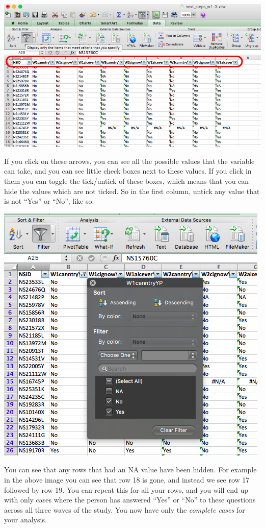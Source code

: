 \documentclass[
]{book}
\begin{document}
\includegraphics{imgs/cc_arrows.png}

If you click on these arrows, you can see all the possible values that the variable can take, and you can see little check boxes next to these values. If you click in them you can toggle the tick/untick of these boxes, which means that you can hide the values which are not ticked. So in the first column, untick any value that is not ``Yes'' or ``No'', like so:

\includegraphics{imgs/untick_not_yn.png}

You can see that any rows that had an NA value have been hidden. For example in the above image you can see that row 18 is gone, and instead we see row 17 followed by row 19. You can repeat this for all your rows, and you will end up with only cases where the person has answered ``Yes'' or ``No'' to these questions across all three waves of the study. You now have only the \emph{complete cases} for your analysis.
\end{document}
